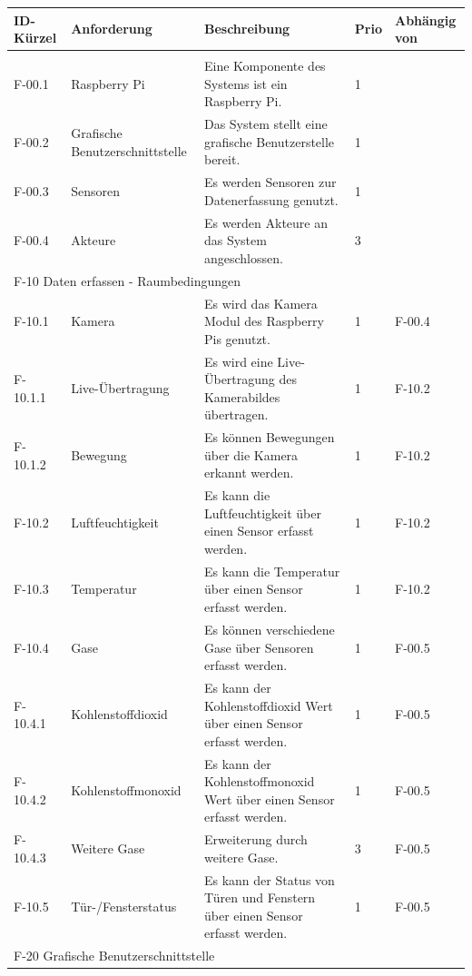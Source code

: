 \begin{tabularx}{\textwidth}{|l|X|X|l|l|}
    \toprule
    \textbf{ID-Kürzel} & \textbf{Anforderung} & \textbf{Beschreibung} & \textbf{Prio} & \textbf{Abhängig von} \\
    \hline
    \endhead
    \hline
    \caption{Anforderungen}
    \label{tab:anforderungen}
    \endfoot
    \multicolumn{5}{|l|}{F-00 Allgemein}\\
    \hline
    F-00.1 & Raspberry Pi & Eine Komponente des Systems ist ein Raspberry Pi. & 1 & \\
    F-00.2 & Grafische Benutzerschnittstelle & Das System stellt eine grafische Benutzerstelle bereit. & 1 & \\
    F-00.3 & Sensoren & Es werden Sensoren zur Datenerfassung genutzt. & 1 & \\
    F-00.4 & Akteure & Es werden Akteure an das System angeschlossen. & 3 & \\
    \hline
    \multicolumn{5}{|l|}{F-10 Daten erfassen - Raumbedingungen}\\
    \hline
    F-10.1   & Kamera & Es wird das Kamera Modul des Raspberry Pis genutzt. & 1 & F-00.4\\
    F-10.1.1 & Live-Übertragung & Es wird eine Live-Übertragung des Kamerabildes übertragen. & 1 & F-10.2 \\
    F-10.1.2 & Bewegung & Es können Bewegungen über die Kamera erkannt werden. & 1 & F-10.2 \\
    F-10.2 & Luftfeuchtigkeit & Es kann die Luftfeuchtigkeit über einen Sensor erfasst werden. & 1 & F-10.2 \\
    F-10.3 & Temperatur & Es kann die Temperatur über einen Sensor erfasst werden. & 1 & F-10.2 \\
    F-10.4 & Gase & Es können verschiedene Gase über Sensoren erfasst werden.  & 1 & F-00.5\\
    F-10.4.1 & Kohlenstoffdioxid & Es kann der Kohlenstoffdioxid Wert über einen Sensor erfasst werden. & 1 & F-00.5\\
    F-10.4.2 & Kohlenstoffmonoxid & Es kann der Kohlenstoffmonoxid Wert über einen Sensor erfasst werden. & 1 & F-00.5\\
    F-10.4.3 & Weitere Gase & Erweiterung durch weitere Gase. & 3 & F-00.5\\
    F-10.5 & Tür-/Fensterstatus & Es kann der Status von Türen und Fenstern über einen Sensor erfasst werden.  & 1 & F-00.5\\
    \hline
    \multicolumn{5}{|l|}{F-20 Grafische Benutzerschnittstelle}\\

\end{tabularx}
